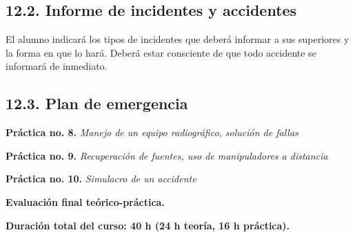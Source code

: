\subsection*{12.2. Informe de incidentes y accidentes}
El alumno indicará los tipos de incidentes que deberá informar a sus superiores y la forma en que lo hará. Deberá estar consciente de que todo accidente se informará de inmediato.

\subsection*{12.3. Plan de emergencia}

\textbf{Práctica no. 8.} \emph{Manejo de un equipo radiográfico, solución de fallas} 

\textbf{Práctica no. 9.} \emph{Recuperación de fuentes, uso de manipuladores a distancia} 

\textbf{Práctica no. 10.} \emph{Simulacro de un accidente} 

\textbf{Evaluación final teórico-práctica.}

\textbf{Duración total del curso: 40 h (24 h teoría, 16 h práctica).}

